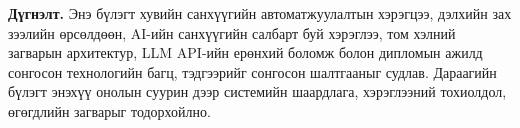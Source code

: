 \textbf{Дүгнэлт.} Энэ бүлэгт хувийн санхүүгийн автоматжуулалтын хэрэгцээ, дэлхийн зах зээлийн өрсөлдөөн, AI-ийн санхүүгийн салбарт буй хэрэглээ, том хэлний загварын архитектур, LLM API-ийн ерөнхий боломж болон дипломын ажилд сонгосон технологийн багц, тэдгээрийг сонгосон шалтгааныг судлав. Дараагийн бүлэгт энэхүү онолын суурин дээр системийн шаардлага, хэрэглээний тохиолдол, өгөгдлийн загварыг тодорхойлно.
